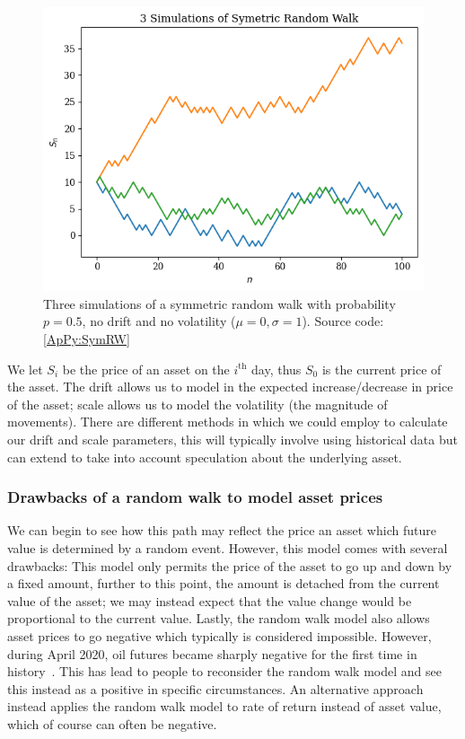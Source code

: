 \begin{figure}[H]
    \centering
    \includegraphics[width=\sOneSize\textwidth]{Chapters/C1/plots/RW_Simulations.png}
    \caption{Three simulations of a symmetric random walk with probability \(p = 0.5\), no drift and no volatility (\(\mu = 0, \sigma = 1\)). Source code: \autoref{ApPy:SymRW}}\label{C1fig:SymRW}
\end{figure}

We let \(S_i \) be the price of an asset on the \(i^{\text{th}}\) day, thus \(S_0\) is the current price of the asset. The drift allows us to model in the expected increase/decrease in price of the asset; scale allows us to model the volatility (the magnitude of movements). There are different methods in which we could employ to calculate our drift and scale parameters, this will typically involve using historical data but can extend to take into account speculation about the underlying asset.

\subsubsection{Drawbacks of a random walk to model asset prices}

We can begin to see how this path may reflect the price an asset which future value is determined by a random event. However, this model comes with several drawbacks: This model only permits the price of the asset to go up and down by a fixed amount, further to this point, the amount is detached from the current value of the asset; we may instead expect that the value change would be proportional to the current value. Lastly, the random walk model also allows asset prices to go negative which typically is considered impossible. However, during April 2020, oil futures became sharply negative for the first time in history~\cite{NegativeOil}. This has lead to people to reconsider the random walk model and see this instead as a positive in specific circumstances. An alternative approach instead applies the random walk model to rate of return instead of asset value, which of course can often be negative.

